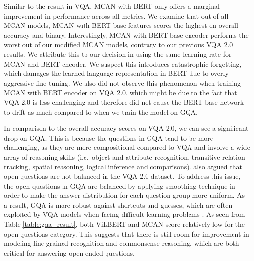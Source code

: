 \documentclass{article}
\begin{document}
Similar to the result in VQA, MCAN with BERT only offers a marginal improvement in performance across all metrics. We examine that out of all MCAN models, MCAN with BERT-base features scores the highest on overall accuracy and binary. Interestingly, MCAN with BERT-base encoder performs the worst out of our modified MCAN models, contrary to our previous VQA 2.0 results. We attribute this to our decision in using the same learning rate for MCAN and BERT encoder. We suspect this introduces catastrophic forgetting, which damages the learned language representation in BERT due to overly aggressive fine-tuning. We also did not observe this phenomenon when training MCAN with BERT encoder on VQA 2.0, which might be due to the fact that VQA 2.0 is less challenging and therefore did not cause the BERT base network to drift as much compared to when we train the model on GQA.


In comparison to the overall accuracy scores on VQA 2.0, we can see a significant drop on GQA. This is because the questions in GQA tend to be more challenging, as they are more compositional compared to VQA and involve a wide array of reasoning skills (i.e.\, object and attribute recognition, transitive relation tracking, spatial reasoning, logical inference and comparisons). \citet{hudson2019gqa} also argued that open questions are not balanced in the VQA 2.0 dataset. To address this issue, the open questions in GQA are balanced by applying smoothing technique in order to make the answer distribution for each question group more uniform. As a result, GQA is more robust against shortcuts and guesses, which are often exploited by VQA models when facing difficult learning problems \citep{agrawal12018gvqa}. As seen from Table \ref{table:gqa_result}, both ViLBERT and MCAN score relatively low for the open questions category. This suggests that there is still room for improvement in modeling fine-grained recognition and commonsense reasoning, which are both critical for answering open-ended questions.

\end{document}
